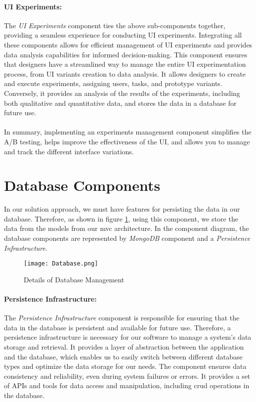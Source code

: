 \paragraph{UI Experiments:}
The \textit{UI Experiments} component ties the above sub-components together, providing a seamless experience for conducting UI experiments. 
Integrating all these components allows for efficient management of UI experiments and provides data analysis capabilities for informed decision-making.
This component ensures that designers have a streamlined way to manage the entire UI experimentation process, from UI variants creation to data analysis. 
It allows designers to create and execute experiments, assigning users, tasks, and prototype variants. 
Conversely, it provides an analysis of the results of the experiments, including both qualitative and quantitative data, and stores the data in a database for future use.\\\\
In summary, implementing an experiments management component simplifies the A/B testing, helps improve the effectiveness of the UI, and allows you to manage and track the different interface variations.

\clearpage
\section{Database Components}
\label{sc:section:persistance}
In our solution approach, we must have features for persisting the data in our database.
Therefore, as shown in figure \ref{fig:sc:database}, using this component, we store the data from the models from our \ac{mvc} architecture.
In the component diagram, the database components are represented by \textit{MongoDB} component and a \textit{Persistence Infrastructure}.

\begin{figure}[htbp!]
    \centering    
    \texttt{[image: Database.png]} 
    \caption[Details of Database Management]{Details of Database Management}
    \label{fig:sc:database}
\end{figure}

\paragraph{Persistence Infrastructure:}
The \textit{Persistence Infrastructure} component is responsible for ensuring that the data in the database is persistent and available for future use.
Therefore, a persistence infrastructure is necessary for our software to manage a system's data storage and retrieval. 
It provides a layer of abstraction between the application and the database, which enables us to easily switch between different database types and optimize the data storage for our needs. 
The component ensures data consistency and reliability, even during system failures or errors. 
It provides a set of APIs and tools for data access and manipulation, including \ac{crud} operations in the database.

